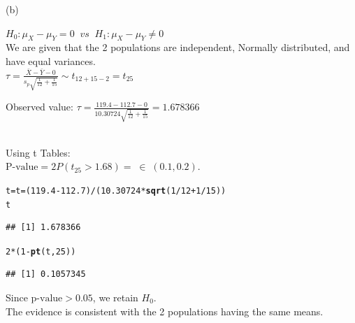 \documentclass[bigtut]{tutorial}\usepackage[]{graphicx}\usepackage[]{color}
\makeatletter
\newcommand{\hlnum}[1]{\textcolor[rgb]{0.686,0.059,0.569}{#1}}%
\newcommand{\hlopt}[1]{\textcolor[rgb]{0,0,0}{#1}}%
\newcommand{\hlstd}[1]{\textcolor[rgb]{0.345,0.345,0.345}{#1}}%
\newcommand{\hlkwb}[1]{\textcolor[rgb]{0.69,0.353,0.396}{#1}}%
\newcommand{\hlkwd}[1]{\textcolor[rgb]{0.737,0.353,0.396}{\textbf{#1}}}%
\newenvironment{kframe}{%
 \def\at@end@of@kframe{}%
 \ifinner\ifhmode%
  \def\at@end@of@kframe{\end{minipage}}%
  \begin{minipage}{\columnwidth}%
 \fi\fi%
 \def\FrameCommand##1{\hskip\@totalleftmargin \hskip-\fboxsep
 \colorbox{shadecolor}{##1}\hskip-\fboxsep
     \hskip-\linewidth \hskip-\@totalleftmargin \hskip\columnwidth}%
 \MakeFramed {\advance\hsize-\width
   \@totalleftmargin\z@ \linewidth\hsize
   \@setminipage}}%
 {\par\unskip\endMakeFramed%
 \at@end@of@kframe}
\newenvironment{knitrout}{}{} %
\makeatother
\begin{document}
\begin{tutorial}
\begin{questions}
\begin{solution}
(b)

\vspace{.5cm}
$H_0: \mu_{X} - \mu_{Y} =0 \;\; vs \;\; H_1: \mu_{X} - \mu_{Y}  \neq 0$ \\

We are given that the 2 populations are independent, Normally distributed, and have  equal variances. \\

$\tau = \frac{  \bar{X} - \bar{Y} - 0  } {  s_p  \sqrt{ \frac{1}{12} +  \frac{1}{15}  }} \sim t_{12 + 15-2} = t_{25}$ 


Observed value: $\tau = \frac{  119.4 - 112.7 - 0  } {  10.30724  \sqrt{ \frac{1}{12} +  \frac{1}{15}  }} = 1.678366$

 \\

Using t Tables: \\
$\text{P-value} = 2 P( t_{25} >1.68 ) =  \; \in \; (0.1,0.2)$. \\

\begin{knitrout}
\color{fgcolor}\begin{kframe}
\begin{alltt}
\hlstd{t}\hlkwb{=}\hlstd{t}\hlkwb{=}\hlstd{(}\hlnum{119.4}\hlopt{-}\hlnum{112.7}\hlstd{)}\hlopt{/}\hlstd{(}\hlnum{10.30724}\hlopt{*}\hlkwd{sqrt}\hlstd{(}\hlnum{1}\hlopt{/}\hlnum{12} \hlopt{+} \hlnum{1}\hlopt{/}\hlnum{15}\hlstd{))}
\hlstd{t}
\end{alltt}
\begin{verbatim}
## [1] 1.678366
\end{verbatim}
\begin{alltt}
\hlnum{2}\hlopt{*}\hlstd{(}\hlnum{1}\hlopt{-}\hlkwd{pt}\hlstd{(t,}\hlnum{25}\hlstd{))}
\end{alltt}
\begin{verbatim}
## [1] 0.1057345
\end{verbatim}
\end{kframe}
\end{knitrout}

\vspace{.5cm}
Since $\text{p-value} > 0.05$, we retain $H_{0}$. \\
The evidence is consistent with the 2 populations having the same means. \\

\end{solution}



\end{questions}
\end{tutorial}
\end{document}
